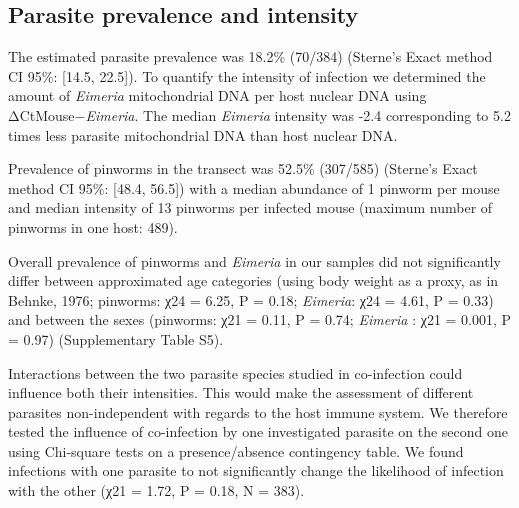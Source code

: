 \subsection{Parasite prevalence and intensity}
The estimated parasite prevalence was 18.2\% (70/384) (Sterne’s Exact method CI 95\%: [14.5, 22.5]). To quantify the intensity of infection we determined the amount of \textit{Eimeria} mitochondrial DNA per host nuclear DNA using ΔCtMouse−\textit{Eimeria}. The median \textit{Eimeria} intensity was -2.4 corresponding to 5.2 times less parasite mitochondrial DNA than host nuclear DNA.
\par Prevalence of pinworms in the transect was 52.5\% (307/585) (Sterne’s Exact method CI 95\%: [48.4, 56.5]) with a median abundance of 1 pinworm per mouse and median intensity of 13 pinworms per infected mouse (maximum number of pinworms in one host: 489). 
\par Overall prevalence of pinworms and \textit{Eimeria} in our samples did not significantly differ between approximated age categories (using body weight as a proxy, as in Behnke, 1976; pinworms: χ24 = 6.25, P = 0.18; \textit{Eimeria}: χ24 = 4.61, P = 0.33) and between the sexes (pinworms: χ21 = 0.11, P = 0.74; \textit{Eimeria} : χ21 = 0.001, P = 0.97) (Supplementary Table S5).
\par Interactions between the two parasite species studied in co-infection could influence both their intensities. This would make the assessment of different parasites non-independent with regards to the host immune system. We therefore tested the influence of co-infection by one investigated parasite on the second one using Chi-square tests on a presence/absence contingency table. We found infections with one parasite to not significantly change the likelihood of infection with the other (χ21 = 1.72, P = 0.18, N = 383).

